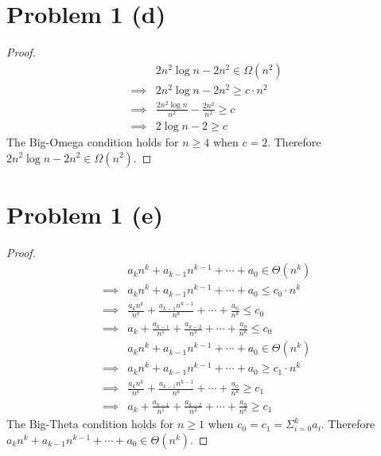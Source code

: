 \documentclass{article}
\newenvironment{problem}[1]{
  \nobreak\section*{Problem #1}
}{}
\newcommand*{\bigOmega}[1]{\ensuremath{\Omega\left(#1\right)}}
\newcommand*{\bigTheta}[1]{\ensuremath{\Theta\left(#1\right)}}
\begin{document}
  \begin{problem}{1 (d)}
    \begin{proof}
      \begin{equation*}
        \begin{split}
          & 2n^2\log{n} - 2n^2 \in \bigOmega{n^2} \\
          \implies & 2n^2\log{n} - 2n^2 \ge c \cdot n^2 \\
          \implies & \frac{2n^2\log{n}}{n^2} - \frac{2n^2}{n^2} \ge c \\
          \implies & 2\log{n} - 2 \ge c
        \end{split}
      \end{equation*}
      The Big-Omega condition holds for $n \ge 4$ when $c = 2$.  Therefore $2n^2\log{n} - 2n^2 \in \bigOmega{n^2}$.
    \end{proof}
  \end{problem}

  \begin{problem}{1 (e)}
    \begin{proof}
      \begin{equation*}
        \begin{split}
          & a_{k}n^{k} + a_{k-1}n^{k-1} + \dotsb + a_0 \in \bigTheta{n^k} \\
          \implies & a_{k}n^{k} + a_{k-1}n^{k-1} + \dotsb + a_0 \le c_0 \cdot n^k \\
          \implies & \frac{a_{k}n^{k}}{n^k} + \frac{a_{k-1}n^{k-1}}{n^k} + \dotsb + \frac{a_0}{n^k} \le c_0 \\
          \implies & a_k + \frac{a_{k-1}}{n^1} + \frac{a_{k-2}}{n^2} + \dotsb + \frac{a_0}{n^{k}} \le c_0 \\
          & a_{k}n^{k} + a_{k-1}n^{k-1} + \dotsb + a_0 \in \bigTheta{n^k} \\
          \implies & a_{k}n^{k} + a_{k-1}n^{k-1} + \dotsb + a_0 \ge c_1 \cdot n^k \\
          \implies & \frac{a_{k}n^{k}}{n^k} + \frac{a_{k-1}n^{k-1}}{n^k} + \dotsb + \frac{a_0}{n^k} \ge c_1 \\
          \implies & a_k + \frac{a_{k-1}}{n^1} + \frac{a_{k-2}}{n^2} + \dotsb + \frac{a_0}{n^{k}} \ge c_1
        \end{split}
      \end{equation*}
      The Big-Theta condition holds for $n \ge 1$ when $c_0 = c_1 = \Sigma_{i = 0}^{k} a_i$.  Therefore $a_{k}n^{k} + a_{k-1}n^{k-1} + \dotsb + a_0 \in \bigTheta{n^k}$.
    \end{proof}
  \end{problem}
\end{document}

